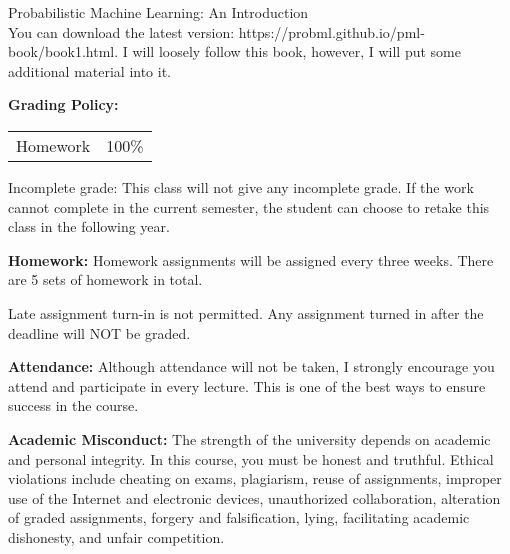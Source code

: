 \documentclass[a4paper,10pt]{article}
\begin{document}
Probabilistic Machine Learning: An Introduction \\
You can download the latest version: https://probml.github.io/pml-book/book1.html. 
 I will loosely follow this book, however, I will put some additional material into it. 


\textbf{Grading Policy:}

\begin{tabular}{lr}
Homework & 100\%\\
\end{tabular}


Incomplete grade: This class will not give any
incomplete grade. If the work cannot complete in the
current semester, the student can choose to retake this
class in the following year.






\textbf{Homework:} Homework assignments will be assigned every three weeks. There are 5 sets of homework in total. 

Late assignment turn-in is not permitted. Any assignment turned in after the deadline will NOT be graded.




\textbf{Attendance:} Although attendance will not be taken, I strongly encourage you attend and participate in every lecture. This is one of the best ways to ensure success in the course.






\textbf{Academic Misconduct:} The strength of the university depends on academic and personal integrity. In this course, you must be honest 
and truthful. Ethical violations include cheating on exams, plagiarism, reuse of assignments, improper use 
of the Internet and electronic devices, unauthorized collaboration, alteration of graded assignments, forgery 
and falsification, lying, facilitating academic dishonesty, and unfair competition.
\end{document}

